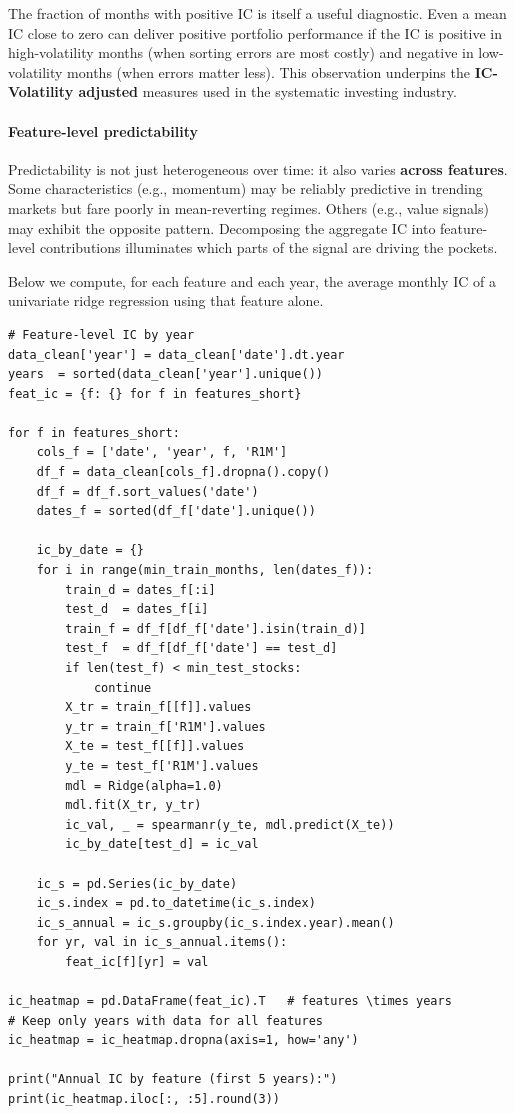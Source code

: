 The fraction of months with positive IC is itself a useful diagnostic. Even a mean IC close to zero can deliver positive portfolio performance if the IC is positive in high-volatility months (when sorting errors are most costly) and negative in low-volatility months (when errors matter less). This observation underpins the \textbf{IC-Volatility adjusted} measures used in the systematic investing industry.

\paragraph{Feature-level predictability}

Predictability is not just heterogeneous over time: it also varies \textbf{across features}. Some characteristics (e.g., momentum) may be reliably predictive in trending markets but fare poorly in mean-reverting regimes. Others (e.g., value signals) may exhibit the opposite pattern. Decomposing the aggregate IC into feature-level contributions illuminates which parts of the signal are driving the pockets.

Below we compute, for each feature and each year, the average monthly IC of a univariate ridge regression using that feature alone.

\begin{verbatim}
# Feature-level IC by year
data_clean['year'] = data_clean['date'].dt.year
years  = sorted(data_clean['year'].unique())
feat_ic = {f: {} for f in features_short}

for f in features_short:
    cols_f = ['date', 'year', f, 'R1M']
    df_f = data_clean[cols_f].dropna().copy()
    df_f = df_f.sort_values('date')
    dates_f = sorted(df_f['date'].unique())

    ic_by_date = {}
    for i in range(min_train_months, len(dates_f)):
        train_d = dates_f[:i]
        test_d  = dates_f[i]
        train_f = df_f[df_f['date'].isin(train_d)]
        test_f  = df_f[df_f['date'] == test_d]
        if len(test_f) < min_test_stocks:
            continue
        X_tr = train_f[[f]].values
        y_tr = train_f['R1M'].values
        X_te = test_f[[f]].values
        y_te = test_f['R1M'].values
        mdl = Ridge(alpha=1.0)
        mdl.fit(X_tr, y_tr)
        ic_val, _ = spearmanr(y_te, mdl.predict(X_te))
        ic_by_date[test_d] = ic_val

    ic_s = pd.Series(ic_by_date)
    ic_s.index = pd.to_datetime(ic_s.index)
    ic_s_annual = ic_s.groupby(ic_s.index.year).mean()
    for yr, val in ic_s_annual.items():
        feat_ic[f][yr] = val

ic_heatmap = pd.DataFrame(feat_ic).T   # features \times years
# Keep only years with data for all features
ic_heatmap = ic_heatmap.dropna(axis=1, how='any')

print("Annual IC by feature (first 5 years):")
print(ic_heatmap.iloc[:, :5].round(3))
\end{verbatim}

